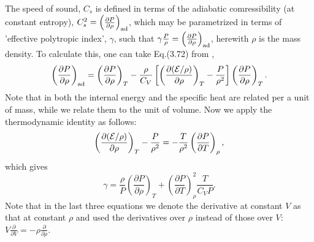 The speed of sound, $C_s$ is defined in terms of the adiabatic comressibility (at constant entropy), $C_s^2=\left(\frac{\partial P}{\partial \rho}\right)_{\rm ad}$, which
may be parametrized in terms of 'effective polytropic index', $\gamma$, such that 
$\gamma\frac{P}\rho=\left(\frac{\partial P}{\partial \rho}\right)_{\rm ad}$, herewith $\rho$ is the mass density. To calculate this, one can take Eq.(3.72) from 
\cite{drake}, 
$$
\left(\frac{\partial P}{\partial \rho}\right)_{\rm ad}=\left(\frac{\partial P}{\partial \rho}\right)_T-
\frac{\rho}{C_V}\left[
\left( \frac{\partial({\cal E}/\rho)}{\partial \rho}\right)_T-\frac{P}{\rho^2}\right]\left(\frac{\partial P}{\partial \rho}\right)_T.
$$
Note that in \cite{drake} both the internal energy and the specific heat are related per a unit of mass, while we relate them to the unit of volume.  
Now we apply the thermodynamic identity as follows:
\begin{equation}
\left( \frac{\partial ({\cal E}/\rho)}{\partial \rho} \right)_{T} - \frac{P}{\rho^2} =
-\frac{T}{\rho^2} \left( \frac{\partial P}{\partial T} \right)_{\rho},
\end{equation}
which gives
\begin{equation}
\gamma = \frac{\rho}{P} \left( \frac{\partial P}{\partial \rho} \right)_T +
\left( \frac{\partial P}{\partial T} \right)^2_\rho \frac{T}{C_V P}.
\end{equation}
Note that in the last three equations we denote the derivative at constant $V$ as that at constant $\rho$ and used the derivatives over $\rho$ instead of those over $V$:
 $V\frac\partial{\partial V}=-\rho\frac\partial{\partial \rho}$.